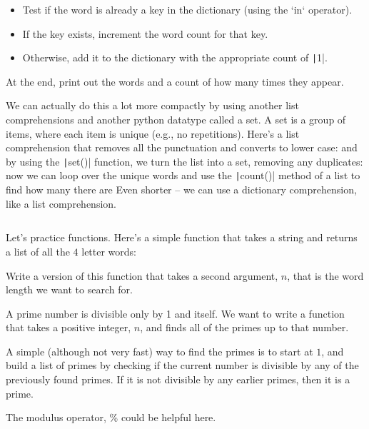 \begin{questions}
\begin{itemize}
		\item

		      Test if the word is already a key in the dictionary (using the `in` operator).

		\item

		      If the key exists, increment the word count for that key.

		\item

		      Otherwise, add it to the dictionary with the appropriate count of \texttt|1|.
	\end{itemize}

	At the end, print out the words and a count of how many times they appear.

	\question

	We can actually do this a lot more compactly by using another list
	comprehensions and another python datatype called a set.
	A set is a group of items, where each item is unique (e.g., no
	repetitions).
	Here's a list comprehension that removes all the punctuation and converts to lower case:
	and by using the \texttt|set()| function, we turn the list into a set, removing any duplicates:
	now we can loop over the unique words and use the \texttt|count()| method of a list to find how many there are
	Even shorter -- we can use a dictionary comprehension, like a list comprehension.

	\inputminted[fontsize=\tiny,linenos]{python}{q8.py}

	\question

	Let's practice functions.
	Here's a simple function that takes a string and returns a list of
	all the $4$ letter words:

	Write a version of this function that takes a second argument, $n$,
	that is the word length we want to search for.

	\question

	A prime number is divisible only by 1 and itself.
	We want to write a function that takes a positive integer, $n$,
	and finds all of the primes up to that number.

	A simple (although not very fast) way to find the primes is to
	start at $1$, and build a list of primes by checking if the current
	number is divisible by any of the previously found primes.
	If it is not divisible by any earlier primes, then it is a prime.

	The modulus operator, \% could be helpful here.


\end{questions}
